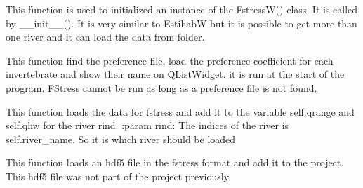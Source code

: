 \documentclass[letterpaper,10pt,english]{sphinxmanual}
\begin{document}
\begin{fulllineitems}
\begin{fulllineitems}
\end{fulllineitems}


\begin{fulllineitems}
\label{\detokenize{index:src_GUI.fstress_GUI.FstressW.init_iu}}
This function is used to initialized an instance of the FstressW() class. It is called by \_\_init\_\_().
It is very similar to EstihabW but it is possible to get more than one river and it can load the data from
folder.

\end{fulllineitems}


\begin{fulllineitems}
\label{\detokenize{index:src_GUI.fstress_GUI.FstressW.load_all_fish}}
This function find the preference file, load the preference coefficient for each invertebrate and show their name
on QListWidget. it is run at the start of the program. FStress cannot be run as long as a preference file is not
found.

\end{fulllineitems}


\begin{fulllineitems}
\label{\detokenize{index:src_GUI.fstress_GUI.FstressW.load_data_fstress}}
This function loads the data for fstress and add it to the variable self.qrange and self.qhw for the river
rind.
:param rind: The indices of the river is self.river\_name. So it is which river should be loaded

\end{fulllineitems}


\begin{fulllineitems}
\label{\detokenize{index:src_GUI.fstress_GUI.FstressW.load_hdf5_fstress}}
This function loads an hdf5 file in the fstress format and add it to the project. This hdf5 file was not part of
the project previously.


\end{fulllineitems}
\end{fulllineitems}
\end{document}
